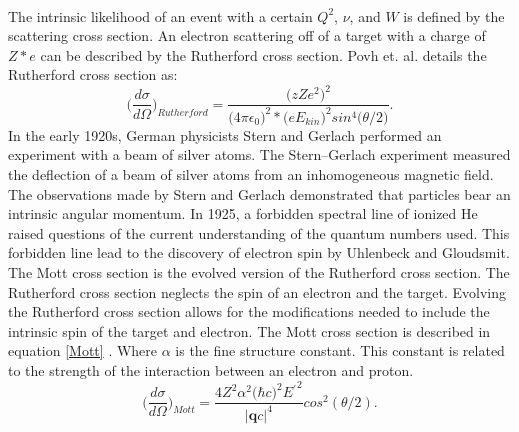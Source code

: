 \paragraph{} The intrinsic likelihood of an event with a certain $Q^2$, $\nu$, and $W$ is defined by the scattering cross section. An electron scattering off of a target with a charge of $Z*e$ can be described by the Rutherford cross section. Povh et. al. \cite{PnN} details the Rutherford cross section as:
\begin{equation}
\bigg(\frac{d\sigma}{d\Omega}\bigg)_{Rutherford} = \frac{ \big(zZe^2\big)^2} {\big( 4\pi \epsilon_0\big)^2 * \big(e E_{kin}\big)^2 sin^4\big( \theta / 2 \big) }. 
\end{equation}
In the early 1920s, German physicists Stern and Gerlach performed an experiment with a beam of silver atoms. The Stern–Gerlach experiment measured the deflection of a beam of silver atoms from an inhomogeneous magnetic field\cite{strger}. The observations made by Stern and Gerlach demonstrated that particles bear an intrinsic angular momentum. In 1925, a forbidden spectral line of ionized He raised questions of the current understanding of the quantum numbers used. This forbidden line lead to the discovery of electron spin by Uhlenbeck and Gloudsmit\cite{e_spin}. The Mott cross section is the evolved version of the Rutherford cross section. The Rutherford cross section neglects the spin of an electron and the target. Evolving the Rutherford cross section allows for the modifications needed to include the intrinsic spin of the target and electron. The Mott cross section is described in equation \ref{Mott} \cite{HighE,PnN}.  Where $\alpha$ is the fine structure constant. This constant is related to the strength of the interaction between an electron and proton\cite{sane}.
\begin{equation}
\bigg(\frac{d\sigma}{d\Omega}\bigg)_{Mott} = \frac{4Z^2\alpha^2 \big(\hbar c \big)^2 E{^{\prime} }^2}{ |\boldsymbol{q}c|^4} cos^2 (\theta/2). \label{Mott}
\end{equation}


